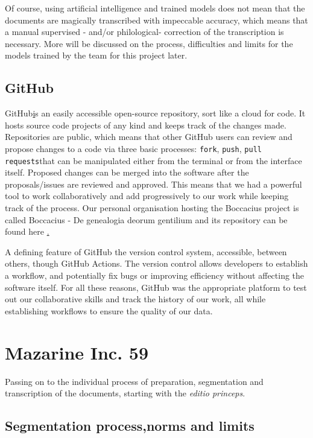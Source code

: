 \documentclass[12pt]{article}
\begin{document}
Of course, using artificial intelligence and trained models does not mean that the documents are magically transcribed with impeccable accuracy, which means that a manual supervised - and/or philological- correction of the transcription is necessary. More will be discussed on the process, difficulties and limits for the models trained by the team for this project later.


\subsection{GitHub}

GitHub\href{https://github.com/} is an easily accessible open-source repository, sort like a cloud for code. It hosts source code projects of any kind and keeps track of the changes made. Repositories are public, which means that other GitHub users can review and propose changes to a code via three basic processes: \texttt{fork}, \texttt{push}, \texttt{pull requests}that can be manipulated either from the terminal or from the interface itself. Proposed changes can be merged into the software after the proposals/issues are reviewed and approved. This means that we had a powerful tool to work collaboratively and add progressively to  our work while keeping track of the process. Our personal organisation hosting the Boccacius project is called Boccacius - De genealogia deorum gentilium and its repository can be found here \href{https://github.com/HN-2021-Boccacius/git-project-Boccace}.

A defining feature of GitHub the version control system, accessible, between others, though GitHub Actions. The version control allows developers to establish a workflow,  and potentially fix bugs or improving efficiency without affecting the software itself. For all these reasons, GitHub was the appropriate platform to test out our collaborative skills and track the history of our work, all while establishing workflows to ensure the quality of our data.

\clearpage
\section{Mazarine Inc. 59}

Passing on to the individual process of preparation, segmentation and transcription of the documents, starting with the \textit{editio princeps}.

\subsection{Segmentation process,norms and limits}
\end{document}
